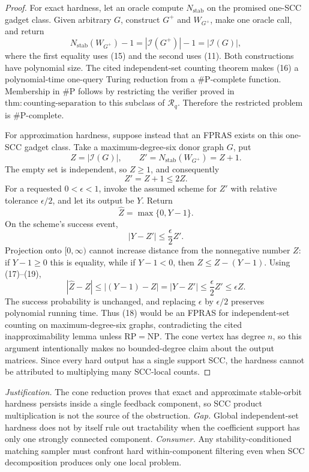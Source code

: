 \documentclass{article}
\begin{document}
\begin{proof}
For exact hardness, let an oracle compute \(N_{\mathrm{stab}}\) on the promised one-SCC gadget class. Given arbitrary \(G\), construct \(G^+\) and \(W_{G^+}\), make one oracle call, and return
\[
 N_{\mathrm{stab}}(W_{G^+})-1
 =|\mathcal I(G^+)|-1
 =|\mathcal I(G)|, \tag{16}
\]
where the first equality uses (15) and the second uses (11). Both constructions have polynomial size. The cited independent-set counting theorem makes (16) a polynomial-time one-query Turing reduction from a \(\#\mathrm P\)-complete function. Membership in \(\#\mathrm P\) follows by restricting the verifier proved in \(\mathrm{thm:counting\mbox{-}separation}\) to this subclass of \(\mathcal R_q\). Therefore the restricted problem is \(\#\mathrm P\)-complete.

For approximation hardness, suppose instead that an FPRAS exists on this one-SCC gadget class. Take a maximum-degree-six donor graph \(G\), put
\[
 Z=|\mathcal I(G)|,
 \qquad
 Z'=N_{\mathrm{stab}}(W_{G^+})=Z+1.
\]
The empty set is independent, so \(Z\geq1\), and consequently
\[
 Z'=Z+1\leq2Z. \tag{17}
\]
For a requested \(0<\epsilon<1\), invoke the assumed scheme for \(Z'\) with relative tolerance \(\epsilon/2\), and let its output be \(Y\). Return
\[
 \widehat Z=\max\{0,Y-1\}. \tag{18}
\]
On the scheme's success event,
\[
 |Y-Z'|\leq\frac{\epsilon}{2}Z'. \tag{19}
\]
Projection onto \([0,\infty)\) cannot increase distance from the nonnegative number \(Z\): if \(Y-1\geq0\) this is equality, while if \(Y-1<0\), then \(Z\leq Z-(Y-1)\). Using (17)--(19),
\[
 |\widehat Z-Z|
 \leq |(Y-1)-Z|
 =|Y-Z'|
 \leq\frac{\epsilon}{2}Z'
 \leq\epsilon Z. \tag{20}
\]
The success probability is unchanged, and replacing \(\epsilon\) by \(\epsilon/2\) preserves polynomial running time. Thus (18) would be an FPRAS for independent-set counting on maximum-degree-six graphs, contradicting the cited inapproximability lemma unless \(\mathrm{RP}=\mathrm{NP}\). The cone vertex has degree \(n\), so this argument intentionally makes no bounded-degree claim about the output matrices. Since every hard output has a single support SCC, the hardness cannot be attributed to multiplying many SCC-local counts.
\end{proof}
\par\smallskip\noindent \textit{Justification.} The cone reduction proves that exact and approximate stable-orbit hardness persists inside a single feedback component, so SCC product multiplication is not the source of the obstruction. \textit{Gap.} Global independent-set hardness does not by itself rule out tractability when the coefficient support has only one strongly connected component. \textit{Consumer.} Any stability-conditioned matching sampler must confront hard within-component filtering even when SCC decomposition produces only one local problem.
\end{document}
